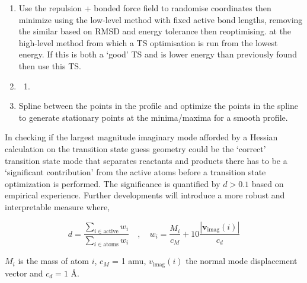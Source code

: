 \documentclass[../../main.tex]{subfiles}
\begin{document}
\begin{enumerate}
\begin{enumerate}
	\end{enumerate}
	
	\item {}
	Use the repulsion + bonded force field to randomise
	coordinates then minimize using the low-level method
	with fixed active bond lengths, removing the similar
	based on RMSD and energy tolerance then reoptimising.
	at the high-level method from which a TS optimisation is
	run from the lowest energy. If this is both a ‘good’ TS
	and is lower energy than previously found then use this
	TS.
	
	\item {}
	\begin{enumerate}
		\item {}
	\end{enumerate}
	
	\item {}
	Spline between the points in the profile and optimize the
	points in the spline to generate stationary points at the
	minima/maxima for a smooth profile.

\end{enumerate}

In checking if the largest magnitude imaginary mode afforded by a Hessian calculation on the transition state guess geometry could be the ‘correct’ transition state mode that separates reactants and products there has to be a ‘significant contribution’ from the active atoms before a transition state optimization is performed. The significance is quantified by $d > 0.1$ based on empirical experience. Further \ade developments will introduce a more robust and interpretable measure where,


\begin{equation}
	d = \frac{\sum_{i \in \text{active}} w_i}{\sum_{i \in \text{atoms}} w_i} \quad,\quad w_i = \frac{M_i}{c_M} + 10 \frac{|\boldsymbol{v}_\text{imag}(i)|}{c_d}
\end{equation}

$M_i$ is the mass of atom $i$, $c_M$ = 1 amu, $v_\text{imag}(i)$ the normal mode displacement vector and $c_d = 1$ \AA. 
\end{document}
